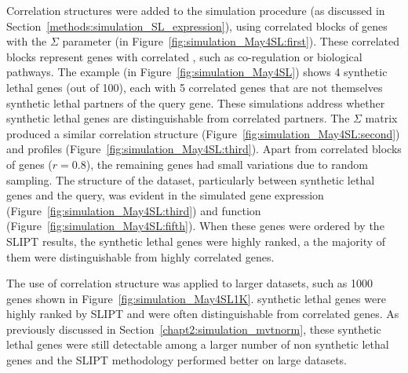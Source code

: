 Correlation structures were added to the simulation procedure (as discussed in Section~\ref{methods:simulation_SL_expression}), using correlated blocks of genes with the $\Sigma$ parameter (in Figure~\ref{fig:simulation_May4SL:first}). These correlated blocks represent genes with correlated , such as co-regulation or biological pathways. The example (in Figure~\ref{fig:simulation_May4SL}) shows 4 \gls{synthetic lethal} genes (out of 100), each with 5 correlated genes that are not themselves \gls{synthetic lethal} partners of the query gene. These simulations address whether \gls{synthetic lethal} genes are distinguishable from correlated partners. The $\Sigma$ matrix produced a similar correlation structure (Figure~\ref{fig:simulation_May4SL:second}) and  profiles (Figure~\ref{fig:simulation_May4SL:third}).  Apart from correlated blocks of genes ($r = 0.8$), the remaining genes had small variations due to random sampling. The structure of the dataset, particularly between \gls{synthetic lethal} genes and the query, was evident in the simulated \gls{gene expression} (Figure~\ref{fig:simulation_May4SL:third}) and function (Figure~\ref{fig:simulation_May4SL:fifth}). When these genes were ordered by the \gls{SLIPT} results, the \gls{synthetic lethal} genes were highly ranked, a the majority of them were distinguishable from highly correlated genes.

The use of correlation structure was applied to larger datasets, such as 1000 genes shown in Figure~\ref{fig:simulation_May4SL1K}. \Gls{synthetic lethal} genes were highly ranked by \gls{SLIPT} and were often distinguishable from correlated genes. As previously discussed in Section~\ref{chapt2:simulation_mvtnorm}, these \gls{synthetic lethal} genes were still detectable among a larger number of non synthetic lethal genes and the \gls{SLIPT} methodology performed better on large datasets.


